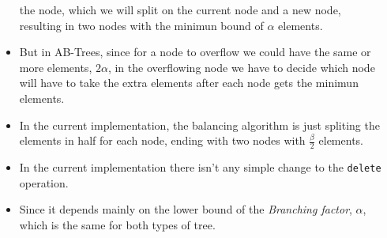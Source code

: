 \begin{frame}
\begin{columns}
\begin{column}{\textlecolumn}
\begin{block}{}
\begin{itemize}
                        the node, which we will split on the current node and a new node, resulting in two nodes with the minimun bound of \(\alpha\) elements.
                    \item But in AB-Trees, since for a node to overflow we could have the same or more elements, \(2\alpha\), in the overflowing node 
                        we have to decide which node will have to take the extra elements after each node gets the minimun elements.
                    \item In the current implementation, the balancing algorithm is just spliting the elements in half for each node, 
                        ending with two nodes with \(\frac{\beta}{2}\) elements.
                \end{itemize}
                \hspace{2cm}
                \begin{itemize}
                    \item In the current implementation there isn't any simple change to the \lstinline|delete| operation.
                    \item Since it depends mainly on the lower bound of the \emph{Branching factor}, \(\alpha\), which is the same for both types of tree.
                \end{itemize}
            \end{block}
        \end{column}
        \begin{column}{\textricolumn}
        \end{column}
    \end{columns}
\end{frame}
